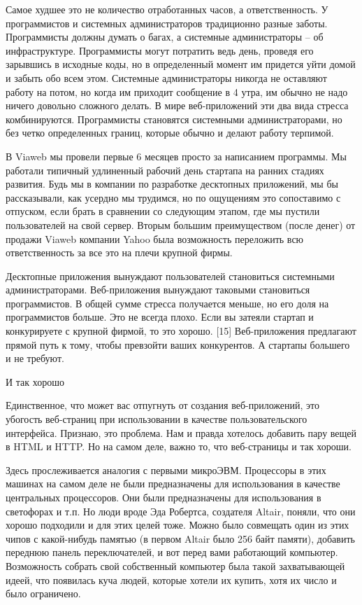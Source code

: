 \documentclass[ebook,12pt,oneside,openany]{memoir}
\begin{document}
Самое худшее это не количество отработанных часов, а ответственность.
У программистов и системных администраторов традиционно разные заботы.
Программисты должны думать о багах, а системные администраторы – об
инфраструктуре. Программисты могут потратить ведь день, проведя его
зарывшись в исходные коды, но в определенный момент им придется уйти
домой и забыть обо всем этом. Системные администраторы никогда не
оставляют работу на потом, но когда им приходит сообщение в 4 утра, им
обычно не надо ничего довольно сложного делать. В мире веб-приложений
эти два вида стресса комбинируются. Программисты становятся системными
администраторами, но без четко определенных границ, которые обычно и
делают работу терпимой.

В Viaweb мы провели первые 6 месяцев просто за написанием программы.
Мы работали типичный удлиненный рабочий день стартапа на ранних
стадиях развития. Будь мы в компании по разработке десктопных
приложений, мы бы рассказывали, как усердно мы трудимся, но по
ощущениям это сопоставимо с отпуском, если брать в сравнении со
следующим этапом, где мы пустили пользователей на свой сервер. Вторым
большим преимуществом (после денег) от продажи Viaweb компании Yahoo
была возможность переложить всю ответственность за все это на плечи
крупной фирмы.

Десктопные приложения вынуждают пользователей становиться системными
администраторами. Веб-приложения вынуждают таковыми становиться
программистов. В общей сумме стресса получается меньше, но его доля на
программистов больше. Это не всегда плохо. Если вы затеяли стартап и
конкурируете с крупной фирмой, то это хорошо. [15] Веб-приложения
предлагают прямой путь к тому, чтобы превзойти ваших конкурентов. А
стартапы большего и не требуют.

И так хорошо

Единственное, что может вас отпугнуть от создания веб-приложений, это
убогость веб-страниц при использовании в качестве пользовательского
интерфейса. Признаю, это проблема. Нам и правда хотелось добавить пару
вещей в HTML и HTTP. Но на самом деле, важно то, что веб-страницы и
так хороши.

Здесь прослеживается аналогия с первыми микроЭВМ. Процессоры в этих
машинах на самом деле не были предназначены для использования в
качестве центральных процессоров. Они были предназначены для
использования в светофорах и т.п. Но люди вроде Эда Робертса,
создателя Altair, поняли, что они хорошо подходили и для этих целей
тоже. Можно было совмещать один из этих чипов с какой-нибудь памятью
(в первом Altair было 256 байт памяти), добавить переднюю панель
переключателей, и вот перед вами работающий компьютер. Возможность
собрать свой собственный компьютер была такой захватывающей идеей, что
появилась куча людей, которые хотели их купить, хотя их число и было
ограничено.
\end{document}

